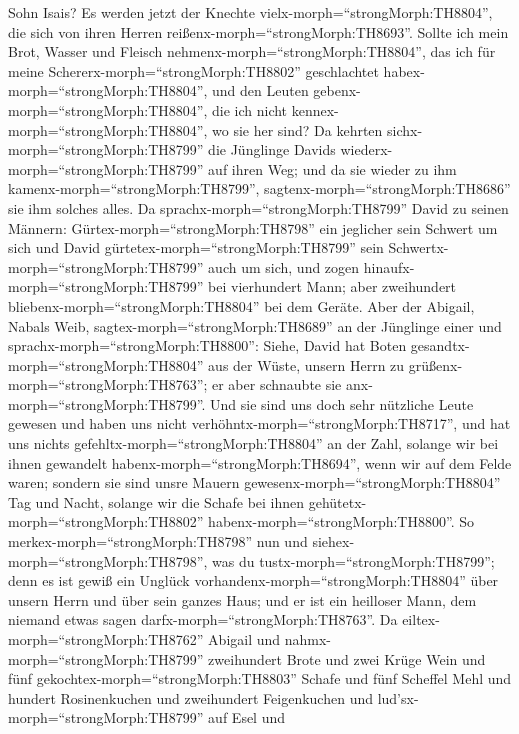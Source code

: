 Sohn Isais? Es werden jetzt der Knechte
vielx-morph=``strongMorph:TH8804'', die sich von ihren Herren
reißenx-morph=``strongMorph:TH8693''.  Sollte ich mein
Brot, Wasser und Fleisch nehmenx-morph=``strongMorph:TH8804'', das ich
für meine Schererx-morph=``strongMorph:TH8802'' geschlachtet
habex-morph=``strongMorph:TH8804'', und den Leuten
gebenx-morph=``strongMorph:TH8804'', die ich nicht
kennex-morph=``strongMorph:TH8804'', wo sie her sind?  Da
kehrten sichx-morph=``strongMorph:TH8799'' die Jünglinge Davids
wiederx-morph=``strongMorph:TH8799'' auf ihren Weg; und da sie wieder zu
ihm kamenx-morph=``strongMorph:TH8799'',
sagtenx-morph=``strongMorph:TH8686'' sie ihm solches alles.
 Da sprachx-morph=``strongMorph:TH8799'' David zu seinen
Männern: Gürtex-morph=``strongMorph:TH8798'' ein jeglicher sein Schwert
um sich und David gürtetex-morph=``strongMorph:TH8799'' sein
Schwertx-morph=``strongMorph:TH8799'' auch um sich, und zogen
hinaufx-morph=``strongMorph:TH8799'' bei vierhundert Mann; aber
zweihundert bliebenx-morph=``strongMorph:TH8804'' bei dem Geräte.
 Aber der Abigail, Nabals Weib,
sagtex-morph=``strongMorph:TH8689'' an der Jünglinge einer und
sprachx-morph=``strongMorph:TH8800'': Siehe, David hat Boten
gesandtx-morph=``strongMorph:TH8804'' aus der Wüste, unsern Herrn zu
grüßenx-morph=``strongMorph:TH8763''; er aber schnaubte sie
anx-morph=``strongMorph:TH8799''.  Und sie sind uns doch
sehr nützliche Leute gewesen und haben uns nicht
verhöhntx-morph=``strongMorph:TH8717'', und hat uns nichts
gefehltx-morph=``strongMorph:TH8804'' an der Zahl, solange wir bei ihnen
gewandelt habenx-morph=``strongMorph:TH8694'', wenn wir auf dem Felde
waren;  sondern sie sind unsre Mauern
gewesenx-morph=``strongMorph:TH8804'' Tag und Nacht, solange wir die
Schafe bei ihnen gehütetx-morph=``strongMorph:TH8802''
habenx-morph=``strongMorph:TH8800''.  So
merkex-morph=``strongMorph:TH8798'' nun und
siehex-morph=``strongMorph:TH8798'', was du
tustx-morph=``strongMorph:TH8799''; denn es ist gewiß ein Unglück
vorhandenx-morph=``strongMorph:TH8804'' über unsern Herrn und über sein
ganzes Haus; und er ist ein heilloser Mann, dem niemand etwas sagen
darfx-morph=``strongMorph:TH8763''.  Da
eiltex-morph=``strongMorph:TH8762'' Abigail und
nahmx-morph=``strongMorph:TH8799'' zweihundert Brote und zwei Krüge Wein
und fünf gekochtex-morph=``strongMorph:TH8803'' Schafe und fünf Scheffel
Mehl und hundert Rosinenkuchen und zweihundert Feigenkuchen und
lud'sx-morph=``strongMorph:TH8799'' auf Esel  und
